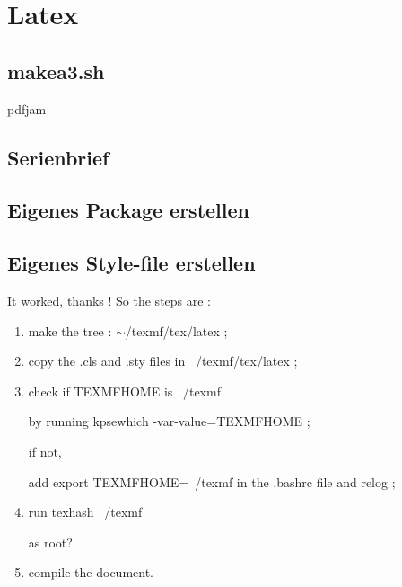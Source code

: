 \section{Latex}
\subsection{makea3.sh}
\begin{tcolorbox}

\end{tcolorbox}

pdfjam

\subsection{Serienbrief}

\subsection{Eigenes Package erstellen}


\subsection{Eigenes Style-file erstellen}
It worked, thanks ! So the steps are : 
\begin{enumerate}
\item 
make the tree : $\sim$/texmf/tex/latex ;

\item 
copy the .cls and .sty files in ~/texmf/tex/latex ;

\item 
check if TEXMFHOME is ~/texmf 

by running kpsewhich -var-value=TEXMFHOME ;

if not, 

add export TEXMFHOME=~/texmf in the .bashrc file and relog ;
\item 
run texhash ~/texmf 

as root?

\item 
compile the document.

\end{enumerate}
